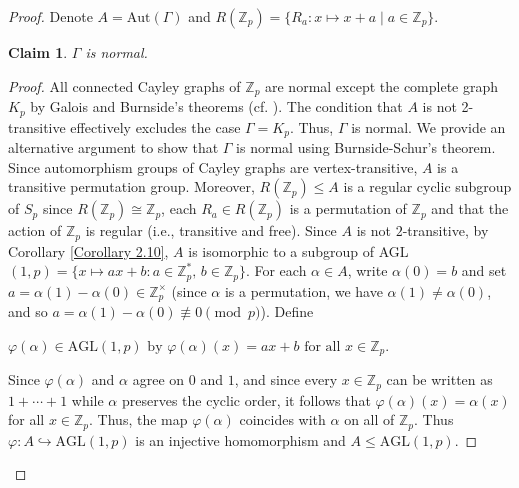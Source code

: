 \documentclass[12pt,reqno,a4paper]{amsart}
\theoremstyle{definition}
\newtheorem{claim}[defn]{Claim}
\begin{document}
\begin{proof}
Denote $A = \mathrm{Aut}(\Gamma)$ and 
$R(\mathbb{Z}_p)=\{R_a:x\mapsto x+a \mid a\in\mathbb{Z}_p\}$. 

\begin{claim}\label{Claim 3.3}
    {\em $\Gamma$ is normal.}
\end{claim}

\begin{proof}
All connected Cayley graphs of $\mathbb{Z}_{p}$ are normal except the complete graph $K_{p}$ by Galois and Burnside’s theorems (cf. \cite[pg. 82]{LX2003}). The condition that $A$ is not 2-transitive effectively excludes the case $\Gamma=K_{p}$.
Thus, $\Gamma$ is normal.
We provide an alternative argument to show that $\Gamma$ is normal using Burnside-Schur's theorem.
Since automorphism groups of Cayley graphs are vertex-transitive, $A$ is a transitive permutation group.
Moreover, $R(\mathbb{Z}_{p})\leq A$ is a regular cyclic subgroup of $S_{p}$ since $R(\mathbb{Z}_{p})\cong \mathbb{Z}_{p}$, each $R_{a}\in R(\mathbb{Z}_{p})$ is a permutation of $\mathbb{Z}_{p}$ and that the action of $\mathbb{Z}_{p}$ is regular (i.e., transitive and free). Since $A$ is not $2$-transitive, by Corollary \ref{Corollary 2.10}, $A$ is isomorphic to a subgroup of AGL$(1,p)
=\{x\mapsto a x + b : a\in\mathbb{Z}_p^{*},\,b\in\mathbb{Z}_p\}$.
For each $\alpha\in A$, write $\alpha(0)=b$ and set
$a=\alpha(1)-\alpha(0)\in\mathbb{Z}_p^{\times}$ (since $\alpha$ is a permutation, we have 
$\alpha(1) \neq \alpha(0)$, and so 
$a=\alpha(1)-\alpha(0) \not\equiv 0 \pmod{p}$).  
Define 
\begin{center}
$\varphi(\alpha) \in \mathrm{AGL}(1,p) \text{ by } 
\varphi(\alpha)(x) = a x + b \text{ for all } x \in \mathbb{Z}_p$.
\end{center}

Since $\varphi(\alpha)$ and $\alpha$ agree on $0$ and $1$, and since every
$x\in\mathbb{Z}_p$ can be written as $1+\cdots+1$ while $\alpha$ preserves the
cyclic order, it follows that $\varphi(\alpha)(x)=\alpha(x)$ for all
$x\in\mathbb{Z}_p$.
Thus, 
the map $\varphi(\alpha)$ coincides with $\alpha$ on all of $\mathbb{Z}_p$. 
Thus $\varphi: A \hookrightarrow \mathrm{AGL}(1,p)$ is an injective homomorphism and  
$A \le \mathrm{AGL}(1,p)$.



\end{proof}
\end{proof}
\end{document}
